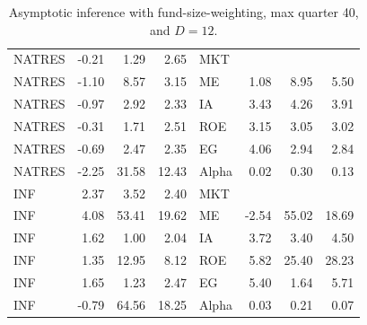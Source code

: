\documentclass[12pt]{article}
\begin{document}
\begin{table}[ht]
\begin{tabular}{lrrrlrrr}
		NATRES & -0.21 & 1.29 & 2.65 & MKT &  &  &  \\ 
		NATRES & -1.10 & 8.57 & 3.15 & ME & 1.08 & 8.95 & 5.50 \\ 
		NATRES & -0.97 & 2.92 & 2.33 & IA & 3.43 & 4.26 & 3.91 \\ 
		NATRES & -0.31 & 1.71 & 2.51 & ROE & 3.15 & 3.05 & 3.02 \\ 
		NATRES & -0.69 & 2.47 & 2.35 & EG & 4.06 & 2.94 & 2.84 \\ 
		NATRES & -2.25 & 31.58 & 12.43 & Alpha & 0.02 & 0.30 & 0.13 \\ 
		INF & 2.37 & 3.52 & 2.40 & MKT &  &  &  \\ 
		INF & 4.08 & 53.41 & 19.62 & ME & -2.54 & 55.02 & 18.69 \\ 
		INF & 1.62 & 1.00 & 2.04 & IA & 3.72 & 3.40 & 4.50 \\ 
		INF & 1.35 & 12.95 & 8.12 & ROE & 5.82 & 25.40 & 28.23 \\ 
		INF & 1.65 & 1.23 & 2.47 & EG & 5.40 & 1.64 & 5.71 \\ 
		INF & -0.79 & 64.56 & 18.25 & Alpha & 0.03 & 0.21 & 0.07 \\ 
		\hline
	\end{tabular}
	\caption{Asymptotic inference with fund-size-weighting, max quarter 40, and $D=12$.} 
	\label{tab:ai_40_fw}
\end{table}
\end{document}
